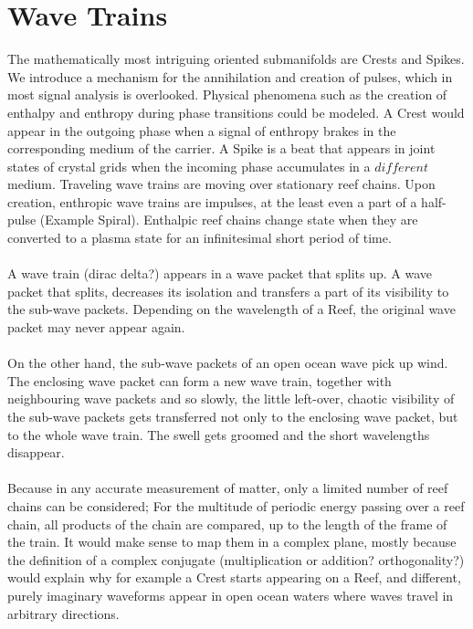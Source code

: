 \documentclass{report}
\begin{document}
\section{Wave Trains}
The mathematically most intriguing oriented submanifolds are Crests and Spikes. We introduce a mechanism for the annihilation and creation of pulses, which in most signal analysis is overlooked. Physical phenomena such as the creation of enthalpy and enthropy during phase transitions could be modeled. A Crest would appear in the outgoing phase when a signal of enthropy brakes in the corresponding medium of the carrier. A Spike is a beat that appears in joint states of crystal grids when the incoming phase accumulates in a $different$ medium.
Traveling wave trains are moving over stationary reef chains. Upon creation, enthropic wave trains are impulses, at the least even a part of a half-pulse (Example Spiral). Enthalpic reef chains change state when they are converted to a plasma state for an infinitesimal short period of time.\\\\
A wave train (dirac delta?) appears in a wave packet that splits up. A wave packet that splits, decreases its isolation and transfers a part of its visibility to the sub-wave packets. Depending on the wavelength of a Reef, the original wave packet may never appear again.\\\\
On the other hand, the sub-wave packets of an open ocean wave pick up wind. The enclosing wave packet can form a new wave train, together with neighbouring wave packets and so slowly, the little left-over, chaotic visibility of the sub-wave packets gets transferred not only to the enclosing wave packet, but to the whole wave train. The swell gets groomed and the short wavelengths disappear.\\\\
Because in any accurate measurement of matter, only a limited number of reef chains can be considered; For the multitude of periodic energy passing over a reef chain, all products of the chain are compared, up to the length of the frame of the train.
It would make sense to map them in a complex plane, mostly because the definition of a complex conjugate (multiplication or addition? orthogonality?) would explain why for example a Crest starts appearing on a Reef, and different, purely imaginary waveforms appear in open ocean waters where waves travel in arbitrary directions.
\end{document}
